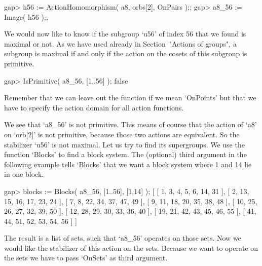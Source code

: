 \beginexample
gap> h56 := ActionHomomorphism( a8, orbs[2], OnPairs );;
gap> a8_56 := Image( h56 );;
\endexample

We would now like to know if the subgroup `u56' of index 56 that we found
is  maximal or  not.
As we have used already in Section~"Actions of groups",
a subgroup is maximal if and only if the action on the cosets of this
subgroup is primitive.

\beginexample
gap> IsPrimitive( a8_56, [1..56] );
false
\endexample

Remember that we  can leave out the  function  if we mean  `OnPoints' but
that we have to specify the action domain for all action functions.

%

We see that `a8_56'   is not primitive. This  means  of course   that the
action  of `a8'  on  `orb[2]'  is not  primitive,  because those   two
actions are equivalent. So the stabilizer `u56' is not maximal. Let us
try to find its supergroups. We use the function `Blocks' to find a block
system. The  (optional) third  argument  in the following   example tells
`Blocks' that we want a block system where 1 and 14 lie in one block.

\beginexample
gap> blocks := Blocks( a8_56, [1..56], [1,14] );
[ [ 1, 3, 4, 5, 6, 14, 31 ], [ 2, 13, 15, 16, 17, 23, 24 ], 
  [ 7, 8, 22, 34, 37, 47, 49 ], [ 9, 11, 18, 20, 35, 38, 48 ], 
  [ 10, 25, 26, 27, 32, 39, 50 ], [ 12, 28, 29, 30, 33, 36, 40 ], 
  [ 19, 21, 42, 43, 45, 46, 55 ], [ 41, 44, 51, 52, 53, 54, 56 ] ]
\endexample

The result is a list  of sets, such that  `a8_56' operates on those sets.
Now we would like  the stabilizer of this  action on the sets. Because
we  want to operate on   the sets we  have  to  pass `OnSets' as  third
argument.

